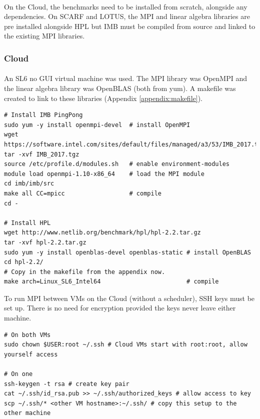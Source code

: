 \documentclass{article}
\newenvironment{code}{\captionsetup{type=listing}}{}
\begin{document}
        \paragraph{}
        On the Cloud, the benchmarks need to be installed from scratch, alongside any dependencies. On SCARF and LOTUS, the MPI and linear algebra libraries are pre installed alongside HPL but IMB must be compiled from source and linked to the existing MPI libraries.

        \subsubsection{Cloud} \label{cloud-installation}

        \paragraph{}
        An SL6 no GUI virtual machine was used. The MPI library was OpenMPI and the linear algebra library was OpenBLAS (both from yum). A makefile was created to link to these libraries (Appendix \ref{appendix:makefile}).

            \begin{code}
            \label{code:builds-cloud-build-sh}
            \begin{verbatim}
# Install IMB PingPong
sudo yum -y install openmpi-devel  # install OpenMPI
wget https://software.intel.com/sites/default/files/managed/a3/53/IMB_2017.tgz
tar -xvf IMB_2017.tgz
source /etc/profile.d/modules.sh   # enable environment-modules
module load openmpi-1.10-x86_64    # load the MPI module
cd imb/imb/src
make all CC=mpicc                  # compile
cd -

# Install HPL
wget http://www.netlib.org/benchmark/hpl/hpl-2.2.tar.gz
tar -xvf hpl-2.2.tar.gz
sudo yum -y install openblas-devel openblas-static # install OpenBLAS
cd hpl-2.2/
# Copy in the makefile from the appendix now.
make arch=Linux_SL6_Intel64                        # compile
            \end{verbatim}
            \end{code}


        To run MPI between VMs on the Cloud (without a scheduler), SSH keys must be set up. There is no need for encryption provided the keys never leave either machine.
            \begin{code}
            \label{code:builds-cloud-setupssh-sh}
            \begin{verbatim}
# On both VMs
sudo chown $USER:root ~/.ssh # Cloud VMs start with root:root, allow yourself access

# On one
ssh-keygen -t rsa # create key pair
cat ~/.ssh/id_rsa.pub >> ~/.ssh/authorized_keys # allow access to key
scp ~/.ssh/* <other VM hostname>:~/.ssh/ # copy this setup to the other machine
            \end{verbatim}
            \end{code}
\end{document}
